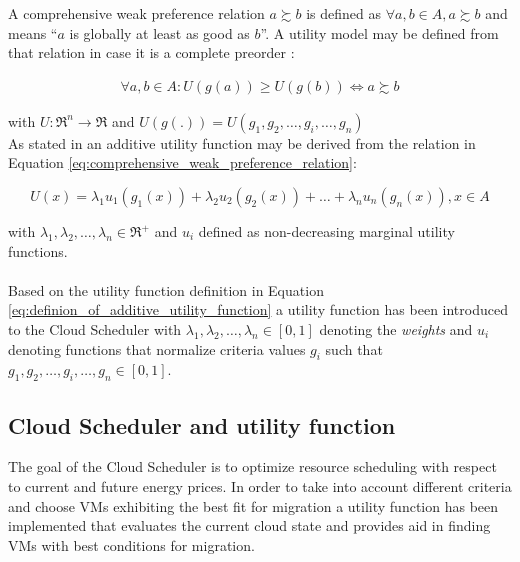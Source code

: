 A comprehensive weak preference relation $a \succsim b$ is defined as $\forall a,b \in A, a \succsim b$ and means ``$a$ is globally at least as good as
$b$''. 
A utility model may be defined from that relation in case it is a complete preorder \cite{angilella2004assessing}:

\begin{align}
	\forall a,b \in A: U(g(a)) \geq U(g(b)) \Leftrightarrow a \succsim b \label{eq:comprehensive_weak_preference_relation}
\end{align}	

with $U : \mathfrak{R}^n \rightarrow \mathfrak{R}$ and $U(g(.)) = U(g_1,g_2,\ldots,g_i,\ldots,g_n)$ \\
As stated in \cite{angilella2004assessing} an additive utility function may be derived from the relation in Equation \ref{eq:comprehensive_weak_preference_relation}:

\begin{equation}
	U(x) = \lambda_1 u_1 (g_1(x)) + \lambda_2 u_2 (g_2(x)) + \ldots + \lambda_n u_n (g_n(x)), x \in A
\label{eq:definion_of_additive_utility_function}
\end{equation}

with $\lambda_1,\lambda_2,\ldots,\lambda_n \in \mathfrak{R}^+$ and $u_i$ defined as non-decreasing marginal utility functions. \\
\\
Based on the utility function definition in Equation \ref{eq:definion_of_additive_utility_function} a utility function has been introduced to the Cloud Scheduler with $\lambda_1,\lambda_2,\ldots,\lambda_n \in [0,1]$ denoting the \textit{weights} and $u_i$ denoting functions that normalize criteria values $g_i$ such that $g_1,g_2,\ldots,g_i,\ldots,g_n \in [0,1]$. 




\subsection{Cloud Scheduler and utility function} \label{ssec:cloud_scheduler_and_utility_function}

The goal of the Cloud Scheduler is to optimize resource scheduling with respect to current and future energy prices. In order to take into account different criteria and choose VMs exhibiting the best fit for migration a utility function has been implemented that evaluates the current cloud state and provides aid in finding VMs with best conditions for migration. 

